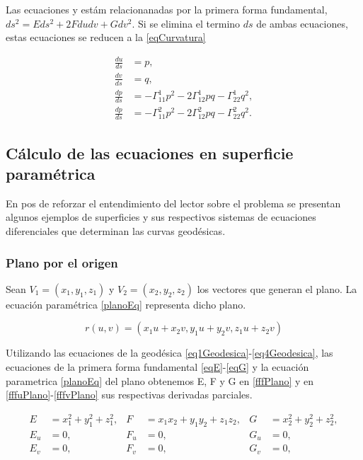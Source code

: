 \documentclass{endm}
\begin{document}
Las ecuaciones \label{equ1_Geo} y \label{equ2_Geo} est\'am relacionanadas por la primera forma fundamental, $ds^2 = E ds^2+ 2 Fdudv+ G dv^2$. Si se elimina el termino $ds$ de ambas ecuaciones, estas ecuaciones se reducen a la \ref{eqCurvatura}


\begin{align} 
\frac{du}{ds}&=p, \label{eq1Geodesica}\\
\frac{dv}{ds}&=q, \label{eq2Geodesica}    \\
\frac{dp}{ds}&= - \Gamma_{11}^1 p^2 -2 \Gamma_{12}^1 pq - \Gamma_{22}^1 q^2, \label{eq3Geodesica}\\ 
\frac{dp}{ds}&=- \Gamma_{11}^2 p^2 -2 \Gamma_{12}^2 pq - \Gamma_{22}^2 q^2. \label{eq4Geodesica}
\end{align}

\subsection{C\'alculo de las ecuaciones en superficie param\'etrica}
En pos de reforzar el entendimiento del lector sobre el problema se presentan algunos ejemplos de superficies y sus respectivos sistemas de ecuaciones diferenciales que determinan las curvas geod\'esicas.

\subsubsection{Plano por el origen}
Sean $V_1=(x_1,y_1,z_1)$ y $V_2=(x_2,y_2,z_2)$ los vectores que generan el plano.
La ecuaci\'on param\'etrica \ref{planoEq} representa dicho plano.

\begin{equation} \label{planoEq}
r(u,v) = (x_1 u + x_2 v, y_1 u + y_2 v, z_1 u + z_2 v)
\end{equation}

Utilizando las ecuaciones de la geod\'esica \ref{eq1Geodesica}-\ref{eq4Geodesica}, las ecuaciones de la primera forma fundamental \ref{eqE}-\ref{eqG} y la ecuaci\'on parametrica \ref{planoEq} del plano obtenemos E, F y G en \ref{fffPlano}  y en \ref{fffuPlano}-\ref{fffvPlano} sus respectivas derivadas parciales.

\begin{align} 
E&=x_1^2 + y_1^2 + z_1^2,   & F &=x_1 x_2 + y_1 y_2 + z_1 z_2,   & G&=x_2^2 + y_2^2 + z_2^2, \label{fffPlano} \\
E_u&=0,     & F_u&=0,   & G_u&=0, \label{fffuPlano}\\
E_v&=0,    & F_v&=0,   & G_v&=0, \label{fffvPlano}
\end{align}
\end{document}
